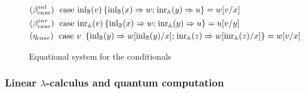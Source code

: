 \documentclass[10pt,a4paper]{amsart}
\theoremstyle{definition}
\theoremstyle{definition}
\theoremstyle{definition}
\theoremstyle{definition}
\theoremstyle{definition}
\theoremstyle{definition}
\begin{document}
  \begin{figure}[h!]
    \centering
    \begin{tcolorbox}[colframe=black, colback=white, boxrule=0.6pt, arc=1pt,boxsep=1pt,top=1pt,bottom=1pt, width=0.85 \textwidth]
    \begin{equation*}
        \begin{split}
          &(\beta_{case}^{inl}) \hspace{3pt} \text{ case } 
          \mathrm{inl}_{\mathbb{B}}(v) \hspace{2pt} \{ \mathrm{inl}_{\mathbb{B}} (x) \Rightarrow w 
          ; \hspace{1pt} \mathrm{inr}_{\mathbb{A}} (y) 
          \Rightarrow u\}= w[v/x]
          \\
          &(\beta_{case}^{inr}) \hspace{3pt} \text{ case } 
          \mathrm{inr}_{\mathbb{A}}(v) \hspace{2pt} \{ \mathrm{inl}_{\mathbb{B}} (x) \Rightarrow w 
          ; \hspace{1pt} \mathrm{inr}_{\mathbb{A}} (y) 
          \Rightarrow u\}= u[v/y]
          \\
          & (\eta_{case}) \hspace{3pt} \text{ case } v\ \hspace{2pt} \{\text{inl}_{\mathbb{B}} (y) \Rightarrow w [ \text{inl}_{\mathbb{B}}(y)/x] ; \hspace{1pt} \text{inr}_{\mathbb{A}} (z) \Rightarrow w [ \text{inr}_{\mathbb{A}}(z)/x]\} = w[v/x] 
        \end{split}
    \end{equation*}
    \end{tcolorbox}
    \caption{Equational system for the conditionals}
    \label{fig:equations-in-context-cond}
    \end{figure}


\subsubsection{Linear $\lambda$-calculus and quantum computation}
\end{document}
